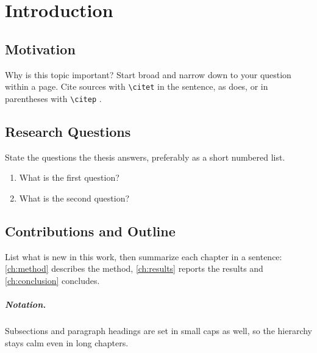 \chapter{Introduction}\label{ch:introduction}

\section{Motivation}
Why is this topic important? Start broad and narrow down to your question within a page.
Cite sources with \texttt{\textbackslash citet} in the sentence, as \citet{knuth84} does,
or in parentheses with \texttt{\textbackslash citep} \citep{lamport94}.

\section{Research Questions}
State the questions the thesis answers, preferably as a short numbered list.
\begin{enumerate}
  \item What is the first question?
  \item What is the second question?
\end{enumerate}

\section{Contributions and Outline}
List what is new in this work, then summarize each chapter in a sentence:
\cref{ch:method} describes the method, \cref{ch:results} reports the results and
\cref{ch:conclusion} concludes.

\paragraph{Notation.} Subsections and paragraph headings are set in small caps as well, so
the hierarchy stays calm even in long chapters.
